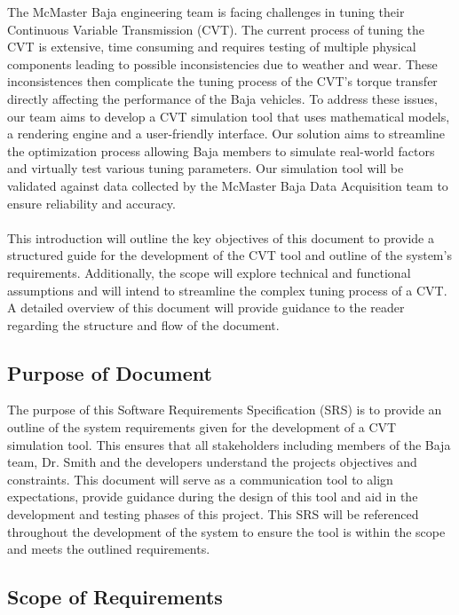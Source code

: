 \documentclass[12pt]{article}
\begin{document}
The McMaster Baja engineering team is facing challenges in tuning their Continuous Variable Transmission (CVT). 
The current process of tuning the CVT is extensive, time consuming and requires testing of multiple physical components leading to possible inconsistencies due to weather and wear. 
These inconsistences then complicate the tuning process of the CVT’s torque transfer directly affecting the performance of the Baja vehicles. 
To address these issues, our team aims to develop a CVT simulation tool that uses mathematical models, a rendering engine and a user-friendly interface. 
Our solution aims to streamline the optimization process allowing Baja members to simulate real-world factors and virtually test various tuning parameters. 
Our simulation tool will be validated against data collected by the McMaster Baja Data Acquisition team to ensure reliability and accuracy.  
\\
\\
This introduction will outline the key objectives of this document to provide a structured guide for the development of the CVT tool and outline of the system’s requirements. 
Additionally, the scope will explore technical and functional assumptions and will intend to streamline the complex tuning process of a CVT. 
A detailed overview of this document will provide guidance to the reader regarding the structure and flow of the document. 

\subsection{Purpose of Document}

The purpose of this Software Requirements Specification (SRS) is to provide an outline of the system requirements given for the development of a CVT simulation tool. 
This ensures that all stakeholders including members of the Baja team, Dr. Smith and the developers understand the projects objectives and constraints. 
This document will serve as a communication tool to align expectations, provide guidance during the design of this tool and aid in the development and testing phases of this project. 
This SRS will be referenced throughout the development of the system to ensure the tool is within the scope and meets the outlined requirements. 

\subsection{Scope of Requirements}
\end{document}
